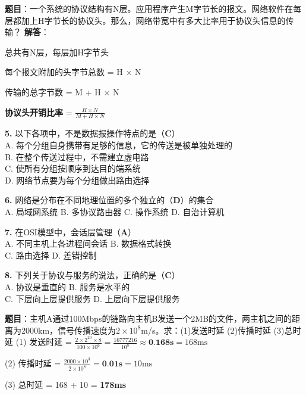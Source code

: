 \begin{examplebox}
\textbf{题目}：一个系统的协议结构有N层。应用程序产生M字节长的报文。网络软件在每层都加上H字节长的协议头。那么，网络带宽中有多大比率用于协议头信息的传输？
\tcblower
\textbf{解答}：

总共有N层，每层加H字节头

每个报文附加的头字节总数 = H × N

传输的总字节数 = M + H × N

\textbf{协议头开销比率} = $\frac{H \times N}{M + H \times N}$
\end{examplebox}


\begin{examplebox}[选择题（续）]
\textbf{5.} 以下各项中，不是数据报操作特点的是（\textbf{C}）\\
A. 每个分组自身携带有足够的信息，它的传送是被单独处理的\\
B. 在整个传送过程中，不需建立虚电路\\
C. 使所有分组按顺序到达目的端系统\\
D. 网络节点要为每个分组做出路由选择

\textbf{6.} 网络是分布在不同地理位置的多个独立的（\textbf{D}）的集合\\
A. 局域网系统 \quad B. 多协议路由器 \quad C. 操作系统 \quad D. 自治计算机

\textbf{7.} 在OSI模型中，会话层管理（\textbf{A}）\\
A. 不同主机上各进程间会话 \quad B. 数据格式转换\\
C. 路由选择 \quad D. 差错控制

\textbf{8.} 下列关于协议与服务的说法，正确的是（\textbf{C}）\\
A. 协议是垂直的 \quad B. 服务是水平的\\
C. 下层向上层提供服务 \quad D. 上层向下层提供服务
\end{examplebox}

\begin{examplebox}
\textbf{题目}：主机A通过100Mbps的链路向主机B发送一个2MB的文件，两主机之间的距离为2000km，信号传播速度为$2\times10^8$m/s。求：(1)发送时延 (2)传播时延 (3)总时延
\tcblower
(1) 发送时延 = $\frac{2 \times 2^{20} \times 8}{100 \times 10^6} = \frac{16777216}{10^8} \approx \textbf{0.168s} = 168\text{ms}$

(2) 传播时延 = $\frac{2000 \times 10^3}{2 \times 10^8} = \textbf{0.01s} = 10\text{ms}$

(3) 总时延 = 168 + 10 = \textbf{178ms}
\end{examplebox}

